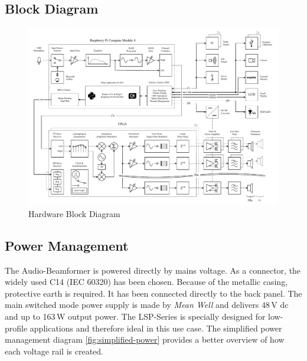 \newpage
\subsection{Block Diagram}
\begin{figure}[h!]
	\centering
	\includegraphics[width=21.5cm, angle=90]{images/4_Design/Hardware/System Block Diagram 2.pdf}
	\vspace{-0.2cm}
    \caption{Hardware Block Diagram}
    \label{fig:hardware-block-diagram}
\end{figure}

\clearpage
\subsection{Power Management}
The Audio-Beamformer is powered directly by mains voltage. As a connector, the widely used C14 (IEC 60320) has been chosen. Because of the metallic casing, protective earth is required. It has been connected directly to the back panel. The main switched mode power supply is made by \textit{Mean Well} and delivers 48\,V \acrshort{dc} and up to 163\,W output power. The LSP-Series is specially designed for low-profile applications and therefore ideal in this use case.\newline
The simplified power management diagram \ref{fig:simplified-power} provides a better overview of how each voltage rail is created.

